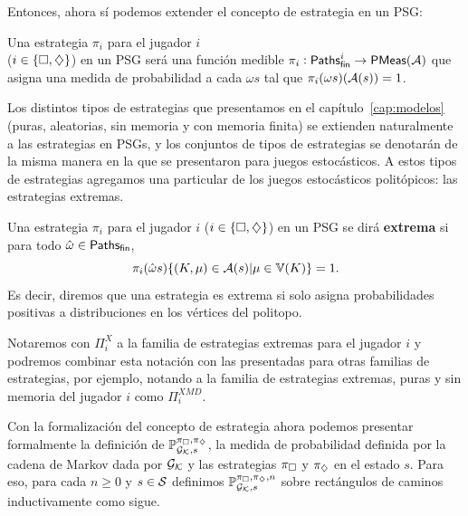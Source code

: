 Entonces, ahora sí podemos extender el concepto de estrategia en un PSG:

\begin{definition}
	Una estrategia $\pi_i$ para el jugador $i$ \\ ($i \in \{\square, \diamondsuit\}$) en un PSG será una función medible $\pi_i : \textsf{Paths}_\textsf{fin}^i \rightarrow \mathsf{PMeas}(\mathcal{A})$ que asigna una medida de probabilidad a cada $\omega s$ tal que $\pi_i(\omega s)(\mathcal{A}(s)) = 1$.
\end{definition}

Los distintos tipos de estrategias que presentamos en el
capítulo~\ref{cap:modelos} (puras, aleatorias, sin memoria y con memoria
finita) se extienden naturalmente a las estrategias en PSGs, y los conjuntos de
tipos de estrategias se denotarán de la misma manera en la que se presentaron
para juegos estocásticos. A estos tipos de estrategias agregamos una particular
de los juegos estocásticos politópicos: las estrategias extremas.

\begin{definition}
	Una estrategia $\pi_i$ para el jugador $i$ ($i \in \{\square, \diamondsuit\}$) en un PSG se dirá \textbf{extrema} si para todo $\hat \omega \in \textsf{Paths}_\textsf{fin}$, $$\pi_i(\hat \omega s)\{(K, \mu) \in \mathcal{A}(s)| \mu \in \mathbb{V}(K)\} = 1.$$ Es decir, diremos que una estrategia es extrema si solo asigna probabilidades positivas a distribuciones en los vértices del politopo.

	Notaremos con $\Pi_i^X$ a la familia de estrategias extremas para el jugador
	$i$ y podremos combinar esta notación con las presentadas para otras familias
	de estrategias, por ejemplo, notando a la familia de estrategias extremas,
	puras y sin memoria del jugador $i$ como $\Pi_i^{XMD}$.
\end{definition}




Con la formalización del concepto de estrategia ahora podemos presentar
formalmente la definición de $\mathbb{P}^{\pi_\square, \pi_\diamondsuit}_{\mathcal{G}_{\mathcal{K}},s}$, la medida de
probabilidad definida por la cadena de Markov dada por $\mathcal{G}_{\mathcal{K}}$ y las estrategias
$\pi_\square$ y $\pi_\diamondsuit$ en el estado $s$. Para eso, para cada $n\geq 0$ y $s \in
	\mathcal{S}$ definimos $\mathbb{P}^{\pi_\square,\pi_\diamondsuit,n}_{\mathcal{G}_{\mathcal{K}},s}$ sobre rectángulos de caminos
inductivamente como sigue.

